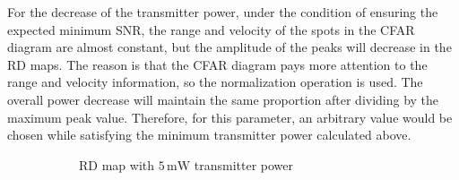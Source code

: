 \documentclass[12pt,DIV14,BCOR12mm,a4paper,footinclude=false,headinclude,parskip=half-,twoside,openright,cleardoublepage=empty,toc=index,bibliography=totoc,listof=totoc]{scrreprt}
\numberwithin{equation}{chapter}
\begin{document}
For the decrease of the transmitter power, under the condition of ensuring the expected minimum SNR, the range and velocity of the spots in the CFAR diagram are almost constant, but the amplitude of the peaks will decrease in the RD maps. The reason is that the CFAR diagram pays more attention to the range and velocity information, so the normalization operation is used. The overall power decrease will maintain the same proportion after dividing by the maximum peak value. Therefore, for this parameter, an arbitrary value would be chosen while satisfying the minimum transmitter power calculated above.

\begin{figure}[t]
    \centering
    \begin{subfigure}{0.45\textwidth}
        \centering
        \caption{RD map with $5\,\mathrm{mW}$ transmitter power}
    \end{subfigure}\hspace{0.5cm}
    \begin{subfigure}{0.45\textwidth}
        \centering

\end{subfigure}
\end{figure}
\end{document}
